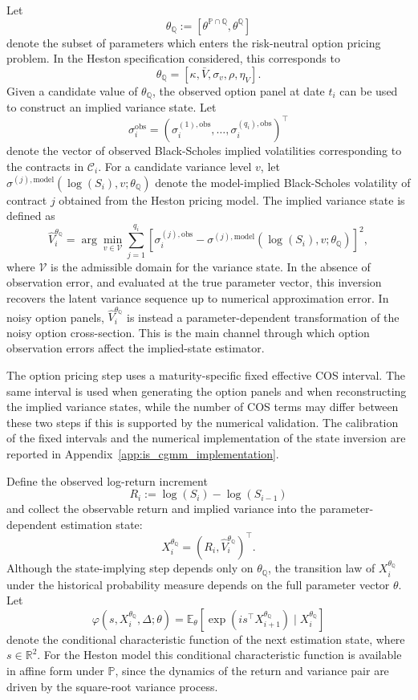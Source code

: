\documentclass[11pt,a4paper,notitlepage]{article}
\numberwithin{equation}{section}
\begin{document}
Let
\[
\theta_{\mathbb Q}
:=
\left[
\theta^{\mathbb{P}\cap\mathbb{Q}},
\theta^\mathbb{Q}
\right]
\]
denote the subset of parameters which enters the risk-neutral option pricing problem. In the Heston specification considered, this corresponds to
\[
\theta_{\mathbb Q}
=
\left[
\kappa,\bar V,\sigma_v,\rho,\eta_V
\right].
\]
Given a candidate value of \(\theta_{\mathbb Q}\), the observed option panel at date \(t_i\) can be used to construct an implied variance state. Let
\[
\sigma_i^{\mathrm{obs}}
=
\left(
\sigma_i^{(1),\mathrm{obs}},
\dots,
\sigma_i^{(q_i),\mathrm{obs}}
\right)^\top
\]
denote the vector of observed Black-Scholes implied volatilities corresponding to the contracts in \(\mathcal C_i\). For a candidate variance level \(v\), let
\(
\sigma^{(j),\mathrm{model}}
\left(
\log(S_i),v;\theta_{\mathbb Q}
\right)
\)
denote the model-implied Black-Scholes volatility of contract \(j\) obtained from the Heston pricing model. The implied variance state is defined as
\[
\widehat V_i^{\theta_{\mathbb Q}}
=
\arg\min_{v\in\mathcal V}
\sum_{j=1}^{q_i}
\left[
\sigma_i^{(j),\mathrm{obs}}
-
\sigma^{(j),\mathrm{model}}
\left(
\log(S_i),v;\theta_{\mathbb Q}
\right)
\right]^2 ,
\label{eq:is_implied_state}
\]
where \(\mathcal V\) is the admissible domain for the variance state. In the absence of observation error, and evaluated at the true parameter vector, this inversion recovers the latent variance sequence up to numerical approximation error. In noisy option panels, \(\widehat V_i^{\theta_{\mathbb Q}}\) is instead a parameter-dependent transformation of the noisy option cross-section. This is the main channel through which option observation errors affect the implied-state estimator.

The option pricing step uses a maturity-specific fixed effective COS interval. The same interval is used when generating the option panels and when reconstructing the implied variance states, while the number of COS terms may differ between these two steps if this is supported by the numerical validation. The calibration of the fixed intervals and the numerical implementation of the state inversion are reported in Appendix~\ref{app:is_cgmm_implementation}.

Define the observed log-return increment
\[
R_i
:=
\log(S_i)-\log(S_{i-1})
\]
and collect the observable return and implied variance into the parameter-dependent estimation state:
\[
X_i^{\theta_{\mathbb Q}}
=
\left(
R_i,
\widehat V_i^{\theta_{\mathbb Q}}
\right)^\top .
\label{eq:is_state_vector}
\]
Although the state-implying step depends only on \(\theta_{\mathbb Q}\), the transition law of \(X_i^{\theta_{\mathbb Q}}\) under the historical probability measure depends on the full parameter vector \(\theta\). Let
\[
\varphi\left(s,X_i^{\theta_{\mathbb Q}},\Delta;\theta\right)
=
\mathbb E_\theta
\left[
\exp\left(
is^\top X_{i+1}^{\theta_{\mathbb Q}}
\right)
\mid X_i^{\theta_{\mathbb Q}}
\right]
\]
denote the conditional characteristic function of the next estimation state, where \(s\in\mathbb R^2\). For the Heston model this conditional characteristic function is available in affine form under \(\mathbb P\), since the dynamics of the return and variance pair are driven by the square-root variance process.
\end{document}
